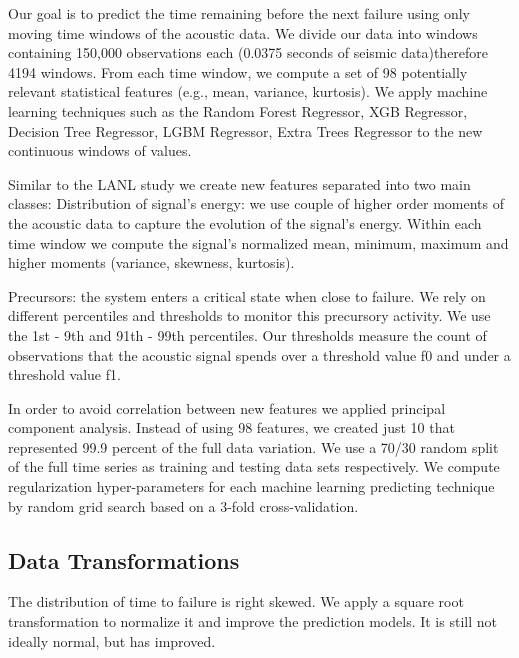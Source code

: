 \documentclass[]{llncs}
\begin{document}


Our goal is to predict the time remaining before the next failure using only moving time windows of the acoustic data. We divide our data into windows containing 150,000 observations each (0.0375 seconds of seismic data)therefore 4194 windows. From each time window, we compute a set of 98 potentially relevant statistical features (e.g., mean, variance, kurtosis). 
We apply machine learning techniques such as the Random Forest Regressor, XGB Regressor,  Decision Tree Regressor, LGBM Regressor, Extra Trees Regressor to the new continuous windows of values.\par
Similar to the LANL study we create new features separated into two main classes: 
Distribution of signal’s energy: we use couple of higher order moments of the acoustic data to capture the evolution of the signal’s energy. Within each time window we compute the signal’s normalized mean, minimum, maximum and higher moments  (variance, skewness, kurtosis).\par
Precursors: the system enters a critical state when close to failure. We rely on different percentiles and thresholds to monitor this precursory activity. We use the 1st - 9th and 91th - 99th percentiles. Our thresholds measure the count of observations that the acoustic signal spends over a threshold value f0 and under a threshold value f1.

In order to avoid correlation between new features we applied principal component analysis.  Instead of using 98 features, we created just 10 that represented 99.9 percent of the full data variation.
We use a 70/30 random split of the full time series as training and testing data sets respectively. We compute regularization hyper-parameters for each machine learning predicting technique by random grid search based on a 3-fold cross-validation.
\subsection{Data Transformations}
The distribution of time to failure is right skewed. We apply a square root transformation to normalize it and improve the prediction models. It is still not ideally normal, but has improved.
\end{document}
